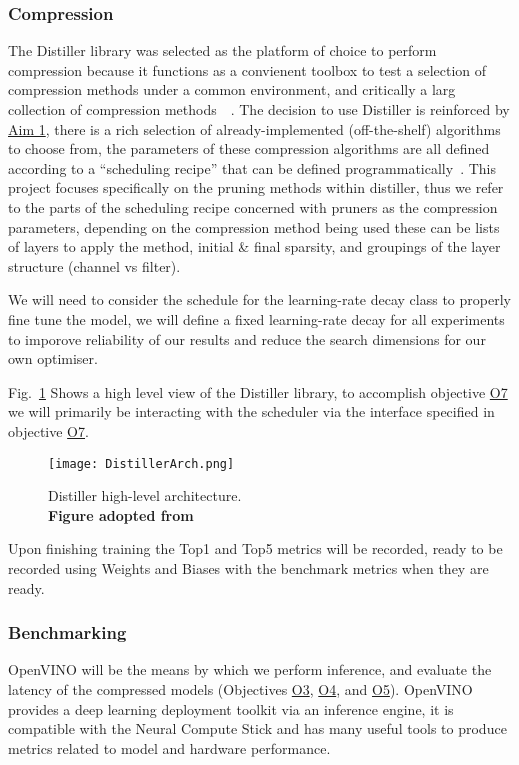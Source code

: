\documentclass[../D1.tex]{subfiles}
\begin{document}
\subsubsection{Compression}
The Distiller library was selected as the platform of choice to perform compression because it functions as a convienent toolbox to test a selection of compression methods under a common environment, and critically a larg collection of compression methods~~\autocite{zmoraNeuralNetworkDistiller2019}.
The decision to use Distiller is reinforced by \hyperref[Aim1]{Aim 1}, there is a rich selection of already-implemented (off-the-shelf) algorithms to choose from, the parameters of these compression algorithms are all defined according to a ``scheduling recipe'' that can be defined programmatically~\autocite{zmoraNeuralNetworkDistiller2019}.
This project focuses specifically on the pruning methods within distiller, thus we refer to the parts of the scheduling recipe concerned with pruners as the compression parameters, depending on the compression method being used these can be lists of layers to apply the method, initial \& final sparsity, and groupings of the layer structure (channel vs filter).


We will need to consider the schedule for the learning-rate decay class to properly fine tune the model, we will define a fixed learning-rate decay for all experiments to imporove reliability of our results and reduce the search dimensions for our own optimiser.

Fig.~\ref{fig:DistillerArch} Shows a high level view of the Distiller library, to accomplish objective \hyperref[obj:CompPara]{O7} we will primarily be interacting with the scheduler via the interface specified in objective \hyperref[obj:CompPara]{O7}.

\begin{figure}[h]
    \texttt{[image: DistillerArch.png]}
    \caption{Distiller high-level architecture.\\ \textbf{Figure adopted from~\autocite{zmoraNeuralNetworkDistiller2019}}}
    \label{fig:DistillerArch}
\end{figure}

Upon finishing training the Top1 and Top5 metrics will be recorded, ready to be recorded using Weights and Biases with the benchmark metrics when they are ready. 

\subsubsection{Benchmarking}
OpenVINO will be the means by which we perform inference, and evaluate the latency of the compressed models (Objectives \hyperref[obj:EvalE2E]{O3}, \hyperref[obj:EvalLayer]{O4}, and \hyperref[obj:EvalComp]{O5}).
OpenVINO provides a deep learning deployment toolkit via an inference engine, it is compatible with the Neural Compute Stick and has many useful tools to produce metrics related to model and hardware performance.
\end{document}
